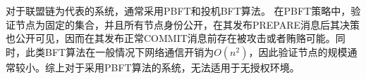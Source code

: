 
对于联盟链为代表的系统\cite{androulaki2018hyperledger}，通常采用PBFT\cite{castro1999practical}和投机BFT算法\cite{kotla2007zyzzyva}。
在PBFT策略中，验证节点为固定的集合，并且所有节点身份公开，在其发布PREPARE消息后其决策也公开可见，因而在其发布正常COMMIT消息前存在被攻击或者贿赂可能。同时，此类BFT算法在一般情况下网络通信开销为$O(n^2)$，因此验证节点的规模通常较小。综上对于采用PBFT算法的系统，无法适用于无授权环境。

